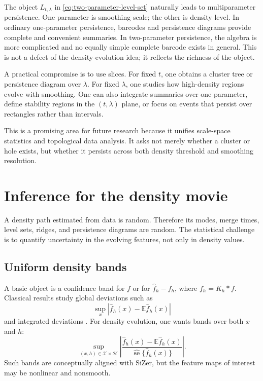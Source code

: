 \documentclass[preprint]{imsart}
\theoremstyle{plain}
\theoremstyle{definition}
\newcommand{\E}{\mathbb{E}}
\newcommand{\fhat}{\widehat f}
\begin{document}
The object $L_{t,\lambda}$ in \eqref{eq:two-parameter-level-set} naturally leads to multiparameter persistence. One parameter is smoothing scale; the other is density level. In ordinary one-parameter persistence, barcodes and persistence diagrams provide complete and convenient summaries. In two-parameter persistence, the algebra is more complicated and no equally simple complete barcode exists in general. This is not a defect of the density-evolution idea; it reflects the richness of the object.

A practical compromise is to use slices. For fixed $t$, one obtains a cluster tree or persistence diagram over $\lambda$. For fixed $\lambda$, one studies how high-density regions evolve with smoothing. One can also integrate summaries over one parameter, define stability regions in the $(t,\lambda)$ plane, or focus on events that persist over rectangles rather than intervals.

This is a promising area for future research because it unifies scale-space statistics and topological data analysis. It asks not merely whether a cluster or hole exists, but whether it persists across both density threshold and smoothing resolution.




\section{Inference for the density movie}
\label{sec:inference}

A density path estimated from data is random. Therefore its modes, merge times, level sets, ridges, and persistence diagrams are random. The statistical challenge is to quantify uncertainty in the evolving features, not only in density values.

\subsection{Uniform density bands}
\label{subsec:uniform-bands}

A basic object is a confidence band for $f$ or for $\fhat_h-f_h$, where $f_h=K_h*f$. Classical results study global deviations such as
\[
  \sup_x |\fhat_h(x)-\E\fhat_h(x)|
\]
and integrated deviations \citep{bickel_1973_GlobalMeasuresDeviations,vandervaart_1996_WeakConvergenceEmpirical,gine_2010_ConfidenceBandsDensity}. For density evolution, one wants bands over both $x$ and $h$:
\begin{equation*}
  \sup_{(x,h)\in\mathcal X\times\mathcal H}
  \left|\frac{\fhat_h(x)-\E\fhat_h(x)}{\widehat{\operatorname{se}}\{\fhat_h(x)\}}\right|.
\end{equation*}
Such bands are conceptually aligned with SiZer, but the feature maps of interest may be nonlinear and nonsmooth.
\end{document}
